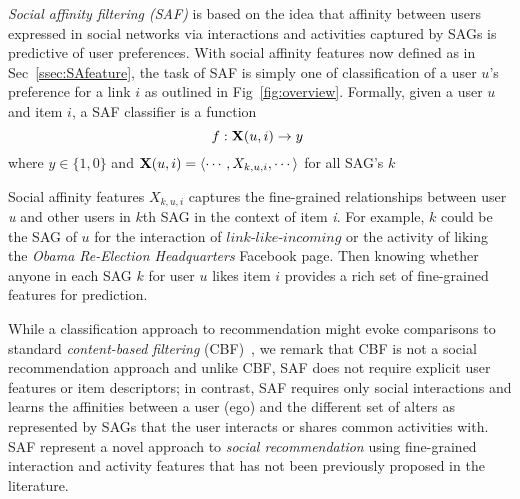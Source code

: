 
\emph{Social affinity filtering (SAF)} is based on the idea that
affinity between users expressed in social networks via interactions
and activities captured by SAGs is predictive of user preferences.
With social affinity features now defined as in Sec~\ref{ssec:SAfeature}, the task of SAF is
simply one of classification of a user $u$'s preference for a link $i$
as outlined in Fig~\ref{fig:overview}. 
Formally, given a user $u$ and item $i$, a SAF classifier is  a
function 
$$f: \x(u,i) \to y\ $$ where $ y \in \{1, 0\}$ and $\x(u,i) = \langle
\cdots,X_{k,u,i},\cdots \rangle$ for all SAG's $k$

Social affinity features $X_{k,u,i}$ captures the fine-grained relationships between user \textit{u}
and other users in $k$th SAG in the context of item \textit{i}.
For example, $k$ could be the SAG of $u$ for the interaction of $\textit{link-like-incoming}$ or the activity of
liking the {\em Obama Re-Election Headquarters} Facebook page.  Then knowing whether
anyone in each SAG $k$ for user $u$ likes item $i$ provides a rich set
of fine-grained features for prediction.

While a classification approach to recommendation might evoke comparisons to standard
\emph{content-based filtering} (CBF)~\cite{newsweeder}, we remark that
CBF is not a social recommendation approach and unlike CBF, SAF does
not require explicit user features or item descriptors; in contrast, SAF
requires only social interactions and learns the affinities between a
user (ego) and the different set of alters as represented by SAGs that
the user interacts or shares common activities with. SAF represent a novel 
approach to \emph{social recommendation} using fine-grained interaction and
activity features that has not been previously proposed in the literature.
 



